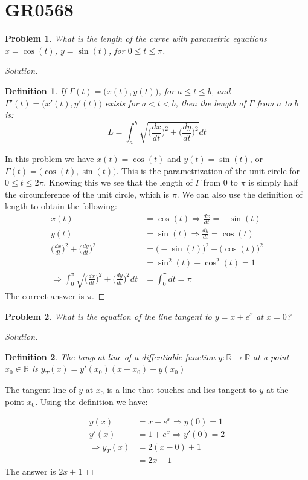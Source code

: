 \documentclass[12pt,oneside]{book}
\theoremstyle{mystyle}
\newtheorem{definition}{Definition}[section]
\newtheorem{problem}{Problem}[section]
\begin{document}
\section{GR0568}
%
\begin{problem}
What is the length of the curve with parametric equations $x=\cos(t)$, $y=\sin(t)$, for $0\leq t \leq \pi$.
\end{problem}
\begin{proof}[Solution]

\begin{definition}
If $\Gamma(t) = \big(x(t),y(t)\big)$, for $a\leq t \leq b$, and $\Gamma'(t) = \big(x'(t),y'(t)\big)$ exists for $a<t<b$, then the length of $\Gamma$ from $a$ to $b$ is:
\begin{equation}
    L = \int_{a}^{b}\sqrt{\bigg(\frac{dx}{dt}\bigg)^2+\bigg(\frac{dy}{dt}\bigg)^2}dt
\end{equation}
\end{definition}
\noindent In this problem we have $x(t) = \cos(t)$ and $y(t) = \sin(t)$, or $\Gamma(t) = \big(\cos(t),\sin(t)\big)$. This is the parametrization of the unit circle for $0\leq t \leq 2\pi$. Knowing this we see that the length of $\Gamma$ from $0$ to $\pi$ is simply half the circumference of the unit circle, which is $\pi$. We can also use the definition of length to obtain the following:
\begin{align}
    \nonumber x(t) &= \cos(t) \Rightarrow \frac{dx}{dt} = -\sin(t) \\
    \nonumber y(t) &= \sin(t) \Rightarrow \frac{dy}{dt} = \cos(t) \\
    \nonumber \bigg(\frac{dx}{dt}\bigg)^2 + \bigg(\frac{dy}{dt}\bigg)^2 &= \big(-\sin(t)\big)^2 +\big(\cos(t)\big)^2 \\
    \nonumber &= \sin^2(t) + \cos^2(t) = 1\\
    \nonumber \Rightarrow \int_{0}^{\pi} \sqrt{\bigg(\frac{dx}{dt}\bigg)^2+\bigg(\frac{dy}{dt}\bigg)^2}dt &= \int_{0}^{\pi}dt = \pi
\end{align}
The correct answer is $\pi$.
\end{proof}

\begin{problem}
What is the equation of the line tangent to $y=x+e^x$ at $x=0$?
\end{problem}
\begin{proof}[Solution]
\begin{definition}
\noindent The tangent line of a diffentiable function $y:\mathbb{R}\rightarrow \mathbb{R}$ at a point $x_0\in \mathbb{R}$ is $y_T(x) = y'(x_0)(x-x_0) + y(x_0)$ 
\end{definition}
The tangent line of $y$ at $x_0$ is a line that touches and lies tangent to $y$ at the point $x_0$. Using the definition we have:

\begin{align}
\nonumber y(x) &= x+e^x \Rightarrow y(0) = 1 \\
\nonumber y'(x) &= 1+e^x\Rightarrow y'(0) = 2\\
\nonumber \Rightarrow y_T(x) &= 2(x-0) + 1\\
\nonumber &= 2x+1
\end{align}
The answer is $2x+1$
\end{proof}
\end{document}
